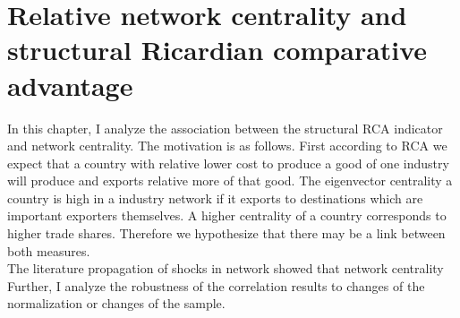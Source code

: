 \chapter{Relative network centrality and structural Ricardian comparative advantage}
In this chapter, I analyze the association between the structural RCA indicator and network centrality. The motivation is as follows. First according to RCA  we expect that a  country with relative lower cost to produce a good of one industry will produce and exports relative more of that good. The eigenvector centrality  a country is high in a industry network if it exports to destinations which are important exporters themselves. A higher centrality of a country corresponds to higher trade shares. Therefore we hypothesize that there may be a link between both measures. \\
The literature propagation of shocks in network  \cite{acemoglu2012} showed that network centrality 
Further, I analyze the robustness of the correlation results to changes of the normalization or changes of the sample.
